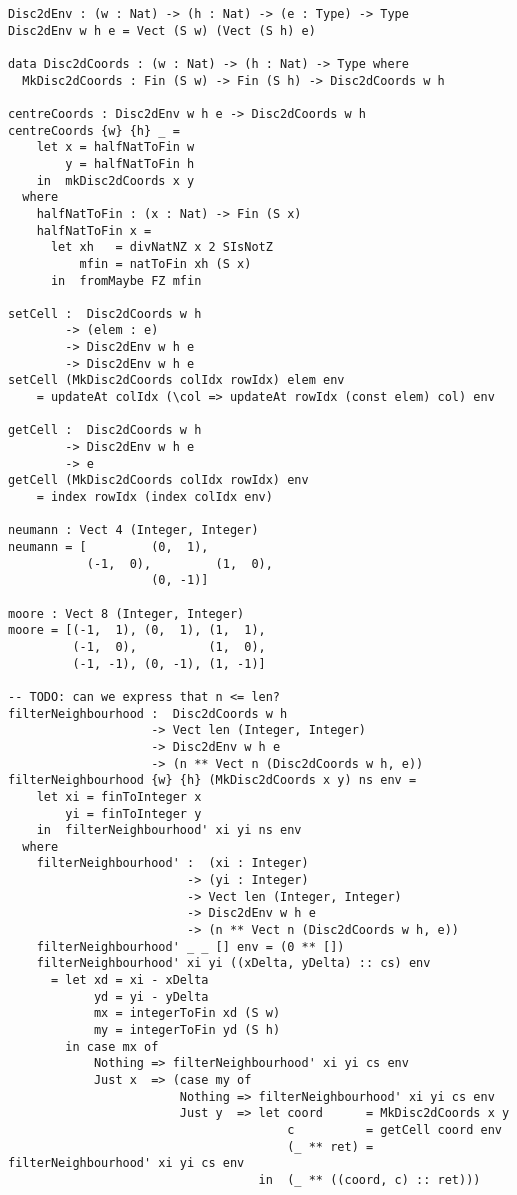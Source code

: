 \begin{verbatim}
Disc2dEnv : (w : Nat) -> (h : Nat) -> (e : Type) -> Type
Disc2dEnv w h e = Vect (S w) (Vect (S h) e)

data Disc2dCoords : (w : Nat) -> (h : Nat) -> Type where
  MkDisc2dCoords : Fin (S w) -> Fin (S h) -> Disc2dCoords w h
  
centreCoords : Disc2dEnv w h e -> Disc2dCoords w h
centreCoords {w} {h} _ =
    let x = halfNatToFin w
        y = halfNatToFin h
    in  mkDisc2dCoords x y
  where
    halfNatToFin : (x : Nat) -> Fin (S x)
    halfNatToFin x = 
      let xh   = divNatNZ x 2 SIsNotZ 
          mfin = natToFin xh (S x)
      in  fromMaybe FZ mfin
      
setCell :  Disc2dCoords w h
        -> (elem : e)
        -> Disc2dEnv w h e
        -> Disc2dEnv w h e
setCell (MkDisc2dCoords colIdx rowIdx) elem env 
    = updateAt colIdx (\col => updateAt rowIdx (const elem) col) env
 
getCell :  Disc2dCoords w h
        -> Disc2dEnv w h e
        -> e
getCell (MkDisc2dCoords colIdx rowIdx) env
    = index rowIdx (index colIdx env)
    
neumann : Vect 4 (Integer, Integer)
neumann = [         (0,  1), 
           (-1,  0),         (1,  0),
                    (0, -1)]

moore : Vect 8 (Integer, Integer)
moore = [(-1,  1), (0,  1), (1,  1),
         (-1,  0),          (1,  0),
         (-1, -1), (0, -1), (1, -1)]

-- TODO: can we express that n <= len?
filterNeighbourhood :  Disc2dCoords w h
                    -> Vect len (Integer, Integer)
                    -> Disc2dEnv w h e 
                    -> (n ** Vect n (Disc2dCoords w h, e))
filterNeighbourhood {w} {h} (MkDisc2dCoords x y) ns env =
    let xi = finToInteger x
        yi = finToInteger y
    in  filterNeighbourhood' xi yi ns env
  where
    filterNeighbourhood' :  (xi : Integer)
                         -> (yi : Integer)
                         -> Vect len (Integer, Integer)
                         -> Disc2dEnv w h e 
                         -> (n ** Vect n (Disc2dCoords w h, e))
    filterNeighbourhood' _ _ [] env = (0 ** [])
    filterNeighbourhood' xi yi ((xDelta, yDelta) :: cs) env 
      = let xd = xi - xDelta
            yd = yi - yDelta
            mx = integerToFin xd (S w)
            my = integerToFin yd (S h)
        in case mx of
            Nothing => filterNeighbourhood' xi yi cs env 
            Just x  => (case my of 
                        Nothing => filterNeighbourhood' xi yi cs env 
                        Just y  => let coord      = MkDisc2dCoords x y
                                       c          = getCell coord env
                                       (_ ** ret) = filterNeighbourhood' xi yi cs env
                                   in  (_ ** ((coord, c) :: ret)))
\end{verbatim}

